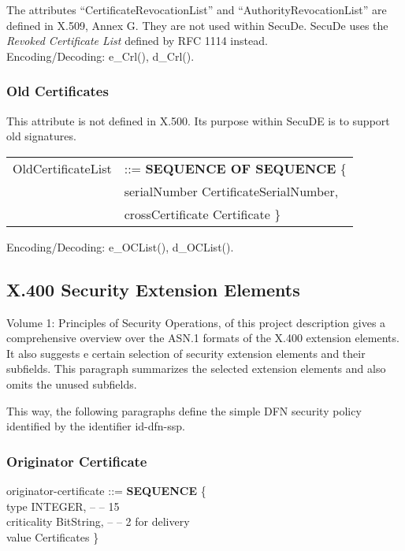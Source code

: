 The attributes ``CertificateRevocationList'' and ``AuthorityRevocationList''
are defined in X.509, Annex G. They are not used within SecuDe.
SecuDe uses the
{\em Revoked Certificate List} defined by
RFC 1114 instead.
\\[1ex]
Encoding/Decoding: e\_Crl(), d\_Crl().

\subsubsection{Old Certificates}
\label{asn1-oldcerts}

This attribute is not defined in X.500. Its purpose within SecuDE
is to support old signatures.

{\small
\begin {center}
\begin {tabular}{ll}
OldCertificateList & ::=  {\small\bf SEQUENCE OF SEQUENCE} \{        \\
		   & serialNumber     CertificateSerialNumber,       \\
		   & crossCertificate Certificate \}
\end {tabular}
\end {center}
}

Encoding/Decoding: e\_OCList(), d\_OCList().

\subsection{X.400 Security Extension Elements}
\label{asn1-x400}
 
Volume 1: Principles of Security Operations, of this project description
gives a comprehensive overview over the ASN.1 formats of the
X.400 extension elements. It also suggests e certain selection
of security extension elements and their subfields.
This paragraph summarizes the selected extension elements
and also omits the unused subfields.

This way, the following paragraphs define the simple DFN security policy
identified by the identifier id-dfn-ssp.

\subsubsection{Originator Certificate}
\label{asn1-origcert}

{\small
\btab
\1 originator-certificate ::= {\bf SEQUENCE} \{ \\
\2         type \3         [0] INTEGER, -- -- 15 \\
\2         criticality \3  [1] BitString, -- -- 2 for delivery \\
\2         value \3        [2] Certificates \} \\
\\
\etab
}

